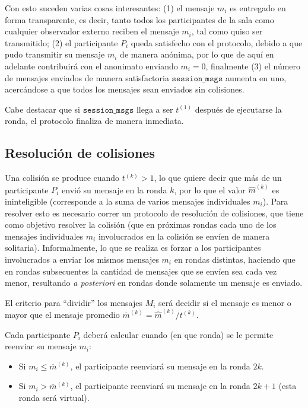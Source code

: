 Con esto suceden varias cosas interesantes: (1) el mensaje $m_i$ es entregado en forma 
transparente, es decir, tanto todos los participantes de la sala como cualquier observador 
externo reciben el mensaje $m_i$, tal como quiso ser transmitido; (2) el participante $P_i$ 
queda satisfecho con el protocolo, debido a que pudo transmitir su mensaje $m_i$ de manera 
anónima, por lo que de aquí en adelante contribuirá con el anonimato enviando $m_i = 0$, 
finalmente (3) el número de mensajes enviados de manera satisfactoria $\mathtt{session\_msgs}$ 
aumenta en uno, acercándose a que todos los mensajes sean enviados sin colisiones.

Cabe destacar que si $\mathtt{session\_msgs}$ llega a ser $t^{(1)}$ después de ejecutarse 
la ronda, el protocolo finaliza de manera inmediata.

\subsection{Resolución de colisiones}

Una colisión se produce cuando $t^{(k)} > 1$, lo que quiere decir que más de un 
participante $P_i$ envió su mensaje en la ronda $k$, por lo que el valor $\hat{m}^{(k)}$ 
es ininteligible (corresponde a la suma de varios mensajes individuales $m_i$). Para resolver 
esto es necesario correr un protocolo de resolución de colisiones, que tiene como objetivo 
resolver la colisión (que en próximas rondas cada uno de los mensajes individuales $m_i$ 
involucrados en la colisión se envíen de manera solitaria). Informalmente, lo que se realiza 
es forzar a los participantes involucrados a enviar los mismos mensajes $m_i$ en rondas 
distintas, haciendo que en rondas subsecuentes la cantidad de mensajes que se envíen sea 
cada vez menor, resultando \emph{a posteriori} en rondas donde solamente un mensaje es enviado.

El criterio para ``dividir'' los mensajes $M_i$ será decidir si el mensaje es menor o mayor que 
el mensaje promedio $\overline{m}^{(k)} = \hat{m}^{(k)} / t^{(k)}$.

Cada participante $P_i$ deberá calcular cuando (en que ronda) se le permite reenviar su mensaje $m_i$:
\begin{itemize}
    \item Si $m_i \leq \overline{m}^{(k)}$, el participante reenviará su mensaje en la ronda $2k$.
    \item Si $m_i > \overline{m}^{(k)}$, el participante reenviará su mensaje en la ronda $2k + 1$ 
    (esta ronda será virtual).
\end{itemize}

